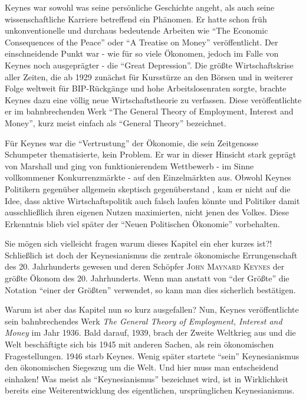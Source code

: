 Keynes war sowohl was seine persönliche Geschichte angeht, als auch seine wissenschaftliche Karriere betreffend ein Phänomen. Er hatte schon früh unkonventionelle und durchaus bedeutende Arbeiten wie \textcite{Keynes1919} "`The Economic Consequences of the Peace"' oder \textcite{Keynes1930} "`A Treatise on Money"' veröffentlicht. Der einschneidende Punkt war - wie für so viele Ökonomen, jedoch im Falle von Keynes noch ausgeprägter - die "`Great Depression"'. Die größte Wirtschaftskrise aller Zeiten,  die ab 1929 zunächst für Kursstürze an den Börsen und in weiterer Folge weltweit für BIP-Rückgänge und hohe Arbeitslosenraten sorgte, brachte Keynes dazu eine völlig neue Wirtschaftstheorie zu verfassen. Diese veröffentlichte er im bahnbrechenden Werk \textcite{Keynes1936} "`The General Theory of Employment, Interest and Money"', kurz meist einfach als "`General Theory"' bezeichnet. 


Für Keynes war die "`Vertrustung"' der Ökonomie, die sein Zeitgenosse Schumpeter thematisierte, kein Problem. Er war in dieser Hinsicht stark geprägt von Marshall und ging von funktionierendem Wettbewerb - im Sinne vollkommener Konkurrenzmärkte - auf den Einzelmärkten aus. 
Obwohl Keynes Politikern gegenüber allgemein skeptisch gegenüberstand \parencite[S. 291]{Scherf1989}, kam er nicht auf die Idee, dass aktive Wirtschaftspolitik auch falsch laufen könnte und Politiker damit ausschließlich ihren eigenen Nutzen maximierten, nicht jenen des Volkes. Diese Erkenntnis blieb viel später der "`Neuen Politischen Ökonomie"' vorbehalten. 




Sie mögen sich vielleicht fragen warum dieses Kapitel ein eher kurzes ist?! Schließlich ist doch der Keynesianismus die zentrale ökonomische Errungenschaft des 20. Jahrhunderts gewesen und deren Schöpfer \textsc{John Maynard Keynes} der größte Ökonom des 20. Jahrhunderts. Wenn man anstatt von "`der Größte"' die Notation "`einer der Größten"' verwendet, so kann man dies sicherlich bestätigen.

Warum ist aber das Kapitel nun so kurz ausgefallen? Nun, Keynes veröffentlichte sein bahnbrechendes Werk \textit{The General Theory of Employment, Interest and Money} im Jahr 1936. Bald darauf, 1939, brach der Zweite Weltkrieg aus und die Welt beschäftigte sich bis 1945 mit anderen Sachen, als rein ökonomischen Fragestellungen. 1946 starb Keynes. Wenig später startete "`sein"' Keynesianismus den ökonomischen Siegeszug um die Welt. Und hier muss man entscheidend einhaken! Was meist als "`Keynesianismus"' bezeichnet wird, ist in Wirklichkeit bereits eine Weiterentwicklung des eigentlichen, ursprünglichen Keynesianismus.

